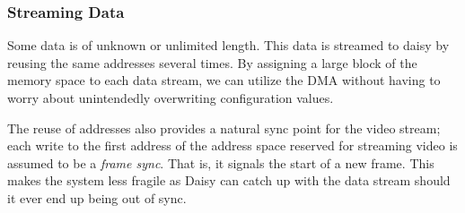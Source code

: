 \subsubsection{Streaming Data}
Some data is of unknown or unlimited length. This data is streamed to daisy by reusing the same addresses several times.
By assigning a large block of the memory space to each data stream, we can utilize the DMA without having to worry about unintendedly overwriting configuration values.

The reuse of addresses also provides a natural sync point for the video stream;
each write to the first address of the address space reserved for streaming video is assumed to be a \textit{frame sync}.
That is, it signals the start of a new frame.
This makes the system less fragile as Daisy can catch up with the data stream should it ever end up being out of sync.
